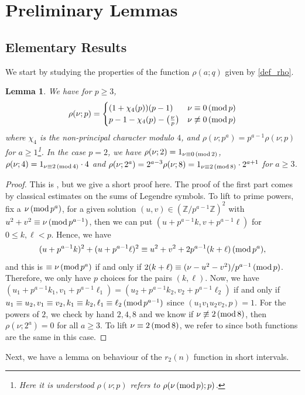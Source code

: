 \documentclass[12pt]{amsart}
\newtheorem{lem}[thm]{Lemma}
\theoremstyle{definition}
\theoremstyle{definition}
\theoremstyle{remark}
\numberwithin{equation}{section}
\newcommand{\Z}{\mathbb{Z}}
\renewcommand{\geq}{\geqslant}
\renewcommand{\leq}{\leqslant}
\renewcommand{\mod}[1]{\,({\rm mod}\,#1)}
\begin{document}
\section{Preliminary Lemmas}

\subsection{Elementary Results}

We start by studying the properties of the function $\rho(a;q)$ given by \eqref{def_rho}.
\begin{lem}\label{rho_function_properties}
We have for $p\geq 3$,
$$ \rho(\nu ; p) = \begin{cases} 
      (1+\chi_4(p))(p-1) & \nu\equiv 0 \mod p \\
      p-1-\chi_4(p)-\big(\frac{\nu}{p}\big) & \nu\not\equiv 0\mod p
   \end{cases} $$
where $\chi_4$ is the non-principal character modulo $4$, and $\rho(\nu;p^a) = p^{a-1} \rho(\nu; p)$ for $a\geq 1$\footnote{Here it is understood $\rho(\nu;p)$ refers to $\rho(\nu\mod p;p)$.}. In the case $p=2$, we have $\rho(\nu;2)= 1_{\nu\equiv 0\mod 2}$, $\rho(\nu;4)=1_{\nu\equiv 2 \mod 4}\cdot 4$ and $\rho(\nu;2^a)= 2^{a-3} \rho(\nu; 8)=1_{\nu\equiv 2 \mod 8}\cdot 2^{a+1}$ for $a\geq 3$.
\end{lem}
\begin{proof}
This is \cite[Lemma 15]{MR616225}, but we give a short proof here. The proof of the first part comes by classical estimates on the sums of Legendre symbols. To lift to prime powers, fix a $\nu \mod{p^a}$, for a given solution $(u,v)\in (\Z/p^{a-1}\Z)^2$ with $u^2+v^2\equiv \nu \mod{p^{a-1}}$, then we can put $(u+p^{a-1}k,v+p^{a-1}\ell)$ for $0\leq k,\ell<p $. Hence, we have
$$ (u+p^{a-1}k)^2+(u+p^{a-1}\ell)^2 \equiv u^2+v^2 +2 p^{a-1}(k+\ell) \mod{p^a}, $$
and this is $\equiv \nu \mod{p^a}$ if and only if $2(k+\ell) \equiv (\nu-u^2-v^2)/p^{a-1} \mod p$. Therefore, we only have $p$ choices for the pairs $(k,\ell)$. Now, we have $(u_1+p^{a-1}k_1,v_1+p^{a-1}\ell_1)=(u_2+p^{a-1}k_2,v_2+p^{a-1}\ell_2)$ if and only if $u_1\equiv u_2, v_1\equiv v_2, k_1\equiv k_2, \ell_1\equiv \ell_2 \mod{p^{a-1}}$ since $(u_1v_1u_2v_2, p)=1$.
For the powers of $2$, we check by hand $2, 4, 8$ and we know if $\nu\not\equiv 2 \mod 8$, then $\rho(\nu;2^a)=0$ for all $a\geq 3$. To lift $\nu\equiv 2 \mod 8$, we refer to \cite[Lemma]{MR1833070} since both functions are the same in this case.
\end{proof}
Next, we have a lemma on behaviour of the $r_2(n)$ function in short intervals.
\end{document}
